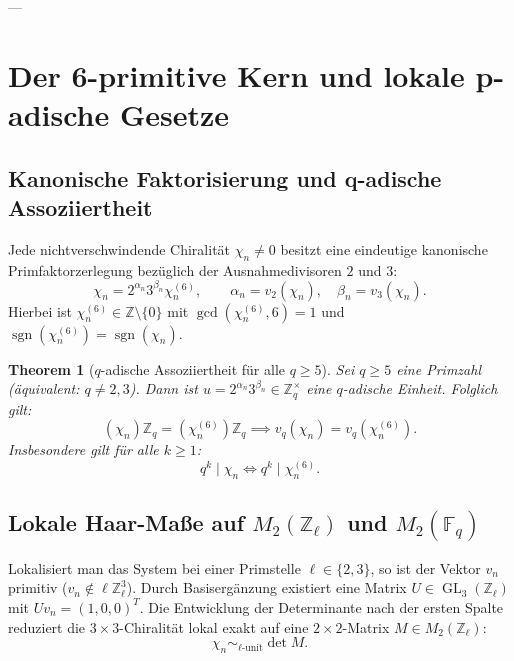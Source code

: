 \documentclass[11pt,a4paper]{article}
\theoremstyle{plain}
\newtheorem{theorem}{Theorem}[section]
\theoremstyle{definition}
\theoremstyle{remark}
\DeclareMathOperator{\GL}{GL}
\begin{document}
---

\section{Der 6-primitive Kern und lokale p-adische Gesetze}

\subsection{Kanonische Faktorisierung und q-adische Assoziiertheit}

Jede nichtverschwindende Chiralität $\chi_n \neq 0$ besitzt eine eindeutige kanonische Primfaktorzerlegung bezüglich der Ausnahmedivisoren $2$ und $3$:
\begin{equation}
\chi_n = 2^{\alpha_n} 3^{\beta_n} \chi_n^{(6)}, \qquad \alpha_n = v_2(\chi_n), \quad \beta_n = v_3(\chi_n).
\end{equation}
Hierbei ist $\chi_n^{(6)} \in \mathbb{Z} \setminus \{0\}$ mit $\gcd(\chi_n^{(6)}, 6) = 1$ und $\operatorname{sgn}(\chi_n^{(6)}) = \operatorname{sgn}(\chi_n)$.

\begin{theorem}[$q$-adische Assoziiertheit für alle $q \ge 5$]
Sei $q \ge 5$ eine Primzahl (äquivalent: $q \neq 2, 3$). Dann ist $u = 2^{\alpha_n} 3^{\beta_n} \in \mathbb{Z}_q^\times$ eine $q$-adische Einheit. Folglich gilt:
\begin{equation}
(\chi_n)\mathbb{Z}_q = (\chi_n^{(6)})\mathbb{Z}_q \implies v_q(\chi_n) = v_q(\chi_n^{(6)}).
\end{equation}
Insbesondere gilt für alle $k \ge 1$:
\begin{equation}
q^k \mid \chi_n \iff q^k \mid \chi_n^{(6)}.
\end{equation}
\end{theorem}

\subsection{Lokale Haar-Maße auf $M_2(\mathbb{Z}_\ell)$ und $M_2(\mathbb{F}_q)$}

Lokalisiert man das System bei einer Primstelle $\ell \in \{2,3\}$, so ist der Vektor $v_n$ primitiv ($v_n \notin \ell\mathbb{Z}_\ell^3$). Durch Basisergänzung existiert eine Matrix $U \in \GL_3(\mathbb{Z}_\ell)$ mit $U v_n = (1, 0, 0)^T$. Die Entwicklung der Determinante nach der ersten Spalte reduziert die $3\times3$-Chiralität lokal exakt auf eine $2\times2$-Matrix $M \in M_2(\mathbb{Z}_\ell)$:
\begin{equation}
\chi_n \sim_{\ell\text{-unit}} \det M.
\end{equation}
\end{document}

